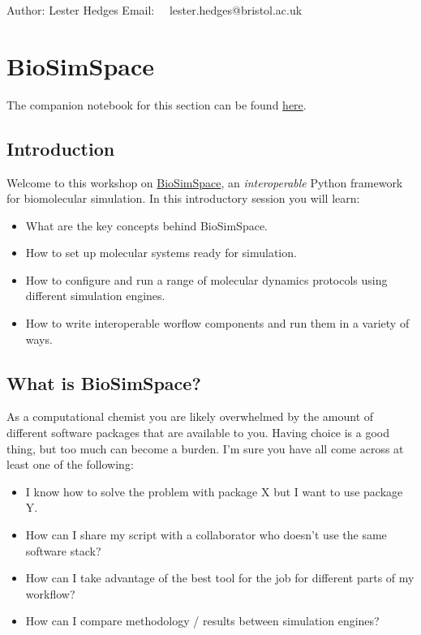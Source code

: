 Author: Lester Hedges Email:~~ lester.hedges@bristol.ac.uk

\hypertarget{biosimspace}{%
\section{BioSimSpace}\label{biosimspace}}

The companion notebook for this section can be found
\href{https://github.com/michellab/BioSimSpaceTutorials/blob/4844562e7d2cd0b269cead56562ec16a3dfaef7c/01_introduction/01_introduction.ipynb}{here}.

\hypertarget{introduction}{%
\subsection{Introduction}\label{introduction}}

Welcome to this workshop on \href{https://biosimspace.org}{BioSimSpace},
an \emph{interoperable} Python framework for biomolecular simulation. In
this introductory session you will learn:

\begin{itemize}
\tightlist
\item
  What are the key concepts behind BioSimSpace.
\item
  How to set up molecular systems ready for simulation.
\item
  How to configure and run a range of molecular dynamics protocols using
  different simulation engines.
\item
  How to write interoperable worflow components and run them in a
  variety of ways.
\end{itemize}

\hypertarget{what-is-biosimspace}{%
\subsection{What is BioSimSpace?}\label{what-is-biosimspace}}

As a computational chemist you are likely overwhelmed by the amount of
different software packages that are available to you. Having choice is
a good thing, but too much can become a burden. I'm sure you have all
come across at least one of the following:

\begin{itemize}
\tightlist
\item
  I know how to solve the problem with package X but I want to use
  package Y.
\item
  How can I share my script with a collaborator who doesn't use the same
  software stack?
\item
  How can I take advantage of the best tool for the job for different
  parts of my workflow?
\item
  How can I compare methodology / results between simulation engines?
\end{itemize}


